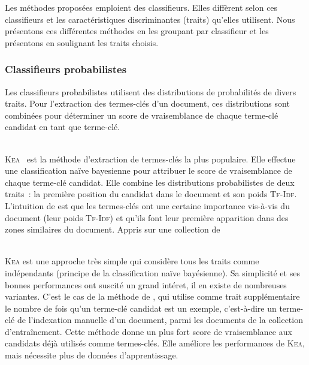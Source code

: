       Les méthodes proposées emploient des classifieurs. Elles diffèrent
      selon ces classifieurs et les caractéristiques discriminantes (traits)
      qu'elles utilisent. Nous présentons ces différentes méthodes en les
      groupant par classifieur et les présentons en soulignant les traits
      choisis.

      \subsubsection{Classifieurs probabilistes}
      \label{subsubsec:main-state_of_the_art-automatic_keyphrase_extraction-supervised_keyphrase_extraction-probabilistic_models}
        Les classifieurs probabilistes utilisent des distributions de
        probabilités de divers traits. Pour l'extraction des termes-clés d'un
        document, ces distributions sont combinées pour déterminer un score de
        vraisemblance de chaque terme-clé candidat en tant que
        \og{}terme-clé\fg{}.

        ~\\\textsc{Kea}~\cite{witten1999kea} est la méthode d'extraction de
        termes-clés la plus populaire. Elle effectue une classification naïve
        bayesienne pour attribuer le score de vraisemblance de chaque terme-clé
        candidat. Elle combine les distributions probabilistes de deux traits~:
        la première position du candidat dans le document et son poids
        \textsc{Tf-Idf}. L'intuition de  est que les
        termes-clés ont une certaine importance vis-à-vis du document (leur
        poids \textsc{Tf-Idf}) et qu'ils font leur première apparition dans des
        zones similaires du document.
          Appris sur une collection de

        ~\\\textsc{Kea} est une approche très simple qui considère tous les
        traits comme indépendants (principe de la classification naïve
        bayésienne). Sa simplicité et ses bonnes performances ont suscité un
        grand intéret, il en existe de nombreuses variantes. C'est le cas de la
        méthode de , qui utilise comme trait
        supplémentaire le nombre de fois qu'un terme-clé candidat est un
        exemple, c'est-à-dire un terme-clé de l'indexation manuelle d'un
        document, parmi les documents de la collection d'entraînement. Cette
        méthode donne un plus fort score de vraisemblance aux candidats déjà
        utilisés comme termes-clés. Elle améliore les performances de
        \textsc{Kea}, mais nécessite plus de données d'apprentissage.
        
